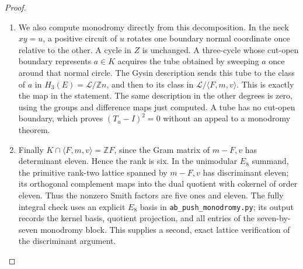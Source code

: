 \begin{proof}
\begin{enumerate}[label=\arabic*.,leftmargin=*]
\item We also compute monodromy directly from this decomposition.
In the neck $xy=u$, a positive circuit of $u$ rotates one
boundary normal coordinate once relative to the other.
A cycle in $Z$ is unchanged. A three-cycle whose cut-open
boundary represents $a\in K$ acquires the tube obtained
by sweeping $a$ once around that normal circle. The Gysin
description sends this tube to the class of $a$ in
$H_3(E)=\mathcal L/\mathbb Z n$, and then to its class in
$\mathcal L/\langle F,m,v\rangle$. This is exactly the
map in the statement. The same description in the other
degrees is zero, using the groups and difference maps just
computed. A tube has no cut-open boundary, which proves
$(T_u-I)^2=0$ without an appeal to a monodromy theorem.

\item Finally $K\cap\langle F,m,v\rangle=\mathbb ZF$, since
the Gram matrix of $m-F,v$ has determinant eleven.
Hence the rank is six. In the unimodular $E_8$ summand,
the primitive rank-two lattice spanned by $m-F,v$ has
discriminant eleven; its orthogonal complement maps into
the dual quotient with cokernel of order eleven. Thus the
nonzero Smith factors are five ones and eleven. The fully
integral check uses an explicit $E_8$ basis in
\texttt{ab\_push\_monodromy.py}; its output records the
kernel basis, quotient projection, and all entries of the
seven-by-seven monodromy block. This supplies a second,
exact lattice verification of the discriminant argument.
\end{enumerate}
\end{proof}

